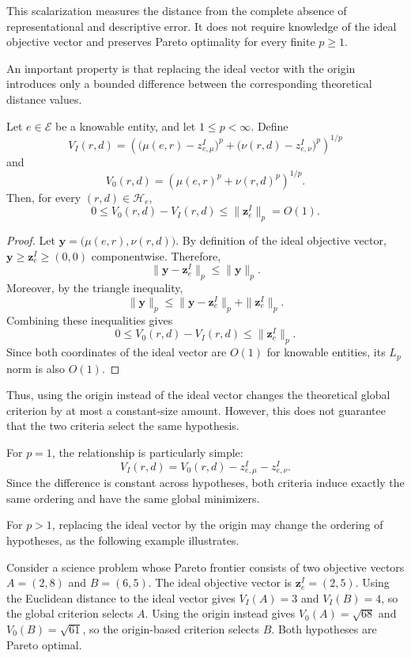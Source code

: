 This scalarization measures the distance from the complete absence of representational and descriptive error. It
does not require knowledge of the ideal objective vector and preserves Pareto optimality for every finite $p\geq1$.

An important property is that replacing the ideal vector with the origin introduces only a bounded difference between the corresponding theoretical distance values.

\begin{proposition}
\label{prop:origin_global_criterion_bound}
Let $e\in\mathcal E$ be a knowable entity, and let $1\leq p<\infty$. Define
\[
V_I(r,d) = \left(\bigl(\mu(e,r)-z_{e,\mu}^I\bigr)^p + \bigl(\nu(r,d)-z_{e,\nu}^I\bigr)^p \right)^{1/p}
\]
and
\[
V_0(r,d) = \left(\mu(e,r)^p+\nu(r,d)^p \right)^{1/p}.
\]
Then, for every $(r,d)\in\mathcal H_e$,
\[
0 \leq V_0(r,d)-V_I(r,d) \leq \|\mathbf z_e^I\|_p=O(1).
\]
\end{proposition}
\begin{proof}
Let $\mathbf y=\bigl(\mu(e,r),\nu(r,d)\bigr)$. By definition of the ideal objective vector, $\mathbf y\geq\mathbf z_e^I\geq(0,0)$ componentwise. Therefore,
\[
\|\mathbf y-\mathbf z_e^I\|_p \leq\|\mathbf y\|_p.
\]
Moreover, by the triangle inequality,
\[
\|\mathbf y\|_p \leq \|\mathbf y-\mathbf z_e^I\|_p + \|\mathbf z_e^I\|_p.
\]
Combining these inequalities gives
\[
0 \leq V_0(r,d)-V_I(r,d) \leq\|\mathbf z_e^I\|_p.
\]
Since both coordinates of the ideal vector are $O(1)$ for knowable entities, its $L_p$ norm is also $O(1)$.
\end{proof}

Thus, using the origin instead of the ideal vector changes the theoretical global criterion by at most a constant-size amount. However, this does not guarantee that the two criteria select the same hypothesis.

For $p=1$, the relationship is particularly simple:
\[
V_I(r,d) = V_0(r,d)-z_{e,\mu}^I-z_{e,\nu}^I.
\]
Since the difference is constant across hypotheses, both criteria induce exactly the same ordering and
have the same global minimizers.

For $p>1$, replacing the ideal vector by the origin may change the ordering of hypotheses, as the following
example illustrates.

\begin{example}
Consider a science problem whose Pareto frontier consists of two objective vectors $A=(2,8)$ and $B=(6,5)$. The ideal objective vector is $\mathbf z_e^I=(2,5)$. Using the Euclidean distance to the ideal vector gives $V_I(A)=3$ and $V_I(B)=4$, so the global criterion selects $A$. Using the origin instead gives $V_0(A)=\sqrt{68}$ and $V_0(B)=\sqrt{61}$, so the origin-based criterion selects $B$. Both hypotheses are Pareto optimal.
\end{example}

